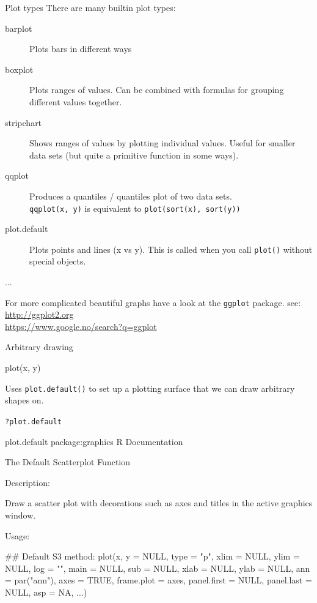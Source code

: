 \documentclass[pdf]{beamer}
\begin{document}
\begin{frame}[fragile]{Plot types}
  There are many builtin plot types:

  {\small
  \begin{description}
  \item[barplot] Plots bars in different ways
  \item[boxplot] Plots ranges of values. Can be combined with formulas for
    grouping different values together.
  \item[stripchart] Shows ranges of values by plotting individual values. Useful
    for smaller data sets (but quite a primitive function in some ways).
  \item[qqplot] Produces a quantiles / quantiles plot of two data sets.\\
    \texttt{qqplot(x, y)} is equivalent to \texttt{plot(sort(x), sort(y))}
  \item[plot.default] Plots points and lines (x vs y). This is called when
    you call \texttt{plot()} without special objects.
  \item[...]
  \end{description}
  
  For more complicated beautiful graphs have a look at the \texttt{ggplot}
  package. see:\\
  \url{http://ggplot2.org}\\
  \url{https://www.google.no/search?q=ggplot}
   }
\end{frame}

\begin{frame}[fragile]{Arbitrary drawing}
  
  \begin{rcode}
    plot(x, y)
  \end{rcode}

  {\small
  Uses \texttt{plot.default()} to set up a plotting surface that we can draw
  arbitrary shapes on.
  }

  \texttt{?plot.default}
  \begin{rcode}
    plot.default             package:graphics              R Documentation

    The Default Scatterplot Function

    Description:

     Draw a scatter plot with decorations such as axes and titles in
     the active graphics window.

    Usage:

     ## Default S3 method:
     plot(x, y = NULL, type = "p",  xlim = NULL, ylim = NULL,
          log = "", main = NULL, sub = NULL, xlab = NULL, ylab = NULL,
          ann = par("ann"), axes = TRUE, frame.plot = axes,
          panel.first = NULL, panel.last = NULL, asp = NA, ...)
  \end{rcode}
\end{frame}
\end{document}
